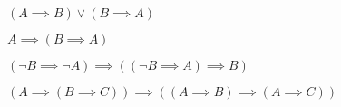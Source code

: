\documentclass[a4paper,12pt]{article}
\begin{document}
\begin{tasks}
    \begin{multicols}{2}
    \begin{subtasks}
        \item $(A \implies B) \lor (B \implies A)$
        \item $A \implies (B \implies A)$
        \item $(\neg B \implies \neg A) \implies ((\neg B \implies A) \implies B)$
        \item $(A \implies (B \implies C)) \implies ((A \implies B) \implies (A \implies C))$
    \end{subtasks}
    \end{multicols}

\end{tasks}
\end{document}
